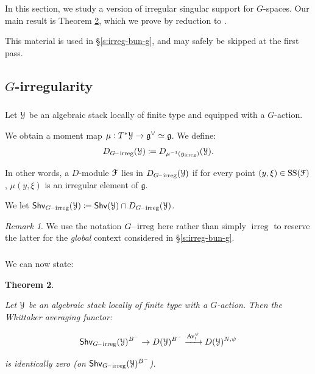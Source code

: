 \documentclass[reqno,11pt]{amsart}
\numberwithin{equation}{subsection}
\newtheorem{thm}{Theorem}[subsubsection]
\theoremstyle{remark}
\newtheorem{rem}[thm]{Remark}
\newcommand{\xar}[1]{\xrightarrow{#1}}
\newcommand{\sF}{{\EuScript F}}
\newcommand{\sY}{{\EuScript Y}}
\newcommand{\fg}{{\mathfrak g}}
\newcommand{\on}{\operatorname}
\newcommand{\mathendash}{\text{\textendash}}
\newcommand{\Av}{\on{Av}}
\newcommand{\Shv}{\mathsf{Shv}}
\newcommand{\irreg}{\on{irreg}}
\newcommand{\Girreg}{G\mathendash\irreg}
\renewcommand{\SS}{\on{SS}}
\begin{document}
In this section, we study a version of irregular singular support 
for $G$-spaces. Our main result is Theorem \ref{t:g-irreg}, which 
we prove by reduction to \cite{losev-holonomic}.

This material is used in \S \ref{s:irreg-bun-g}, and may safely 
be skipped at the first pass.

\subsection{$G$-irregularity}

\subsubsection{}\label{sss:g-irreg}

Let $\sY$ be an algebraic stack locally of finite type and
equipped with a $G$-action.

We obtain a moment map $\mu:T^*\sY \to \fg^{\vee} \simeq \fg$.
We define: 
%
\[
D_{\Girreg}(\sY) \coloneqq D_{\mu^{-1}(\fg_{\irreg})}(\sY).
\]

\noindent In other words, a $D$-module $\sF$ lies in 
$D_{\Girreg}(\sY)$ if for every point $(y,\xi) \in \SS(\sF)$,
$\mu(y,\xi)$ is an irregular element of $\fg$.

We let $\Shv_{\Girreg}(\sY) \coloneqq \Shv(\sY) \cap D_{\Girreg}(\sY)$.

\begin{rem}

We use the notation $\Girreg$ here rather than simply $\irreg$
to reserve the latter for the \emph{global} context considered
in \S \ref{s:irreg-bun-g}.

\end{rem}

\subsubsection{}

We can now state:

\begin{thm}\label{t:g-irreg}

Let $\sY$ be an algebraic stack locally of finite type with a $G$-action. 
Then the Whittaker averaging
functor:

\[
\Shv_{\Girreg}(\sY)^{B^-} \to D(\sY)^{B^-} \xar{\Av_!^{\psi}} D(\sY)^{N,\psi} 
\]

\noindent is identically zero (on $\Shv_{\Girreg}(\sY)^{B^-}$).

\end{thm}
\end{document}
